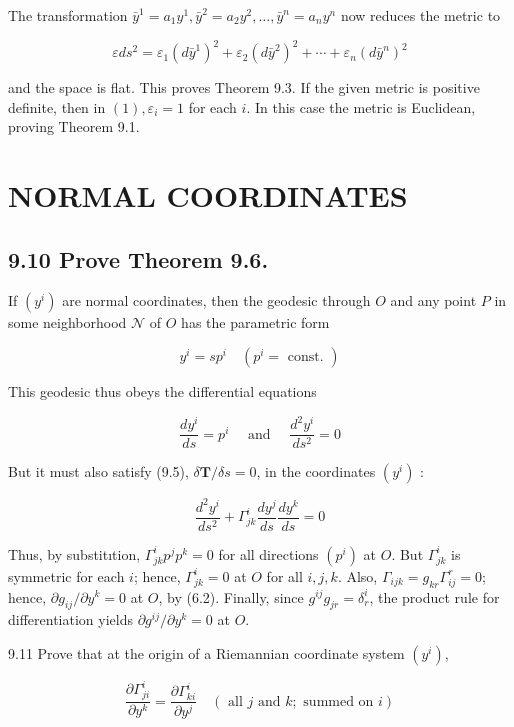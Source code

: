 \documentclass[10pt]{article}
\begin{document}
The transformation $\bar{y}^{1}=a_{1} y^{1}, \bar{y}^{2}=a_{2} y^{2}, \ldots, \bar{y}^{n}=a_{n} y^{n}$ now reduces the metric to


\begin{equation*}
\varepsilon d s^{2}=\varepsilon_{1}\left(d \bar{y}^{1}\right)^{2}+\varepsilon_{2}\left(d \bar{y}^{2}\right)^{2}+\cdots+\varepsilon_{n}\left(d \bar{y}^{n}\right)^{2} \tag{1}
\end{equation*}


and the space is flat. This proves Theorem 9.3. If the given metric is positive definite, then in $(1), \varepsilon_{i}=1$ for each $i$. In this case the metric is Euclidean, proving Theorem 9.1.

\section*{NORMAL COORDINATES}
\subsection*{9.10 Prove Theorem 9.6.}
If $\left(y^{i}\right)$ are normal coordinates, then the geodesic through $O$ and any point $P$ in some neighborhood $\mathcal{N}$ of $O$ has the parametric form

$$
y^{i}=s p^{i} \quad\left(p^{i}=\text { const. }\right)
$$

This geodesic thus obeys the differential equations

$$
\frac{d y^{i}}{d s}=p^{i} \quad \text { and } \quad \frac{d^{2} y^{i}}{d s^{2}}=0
$$

But it must also satisfy (9.5), $\delta \mathbf{T} / \delta s=0$, in the coordinates $\left(y^{i}\right)$ :

$$
\frac{d^{2} y^{i}}{d s^{2}}+\Gamma_{j k}^{i} \frac{d y^{j}}{d s} \frac{d y^{k}}{d s}=0
$$

Thus, by substitıtion, $\Gamma_{j k}^{i} p^{j} p^{k}=0$ for all directions $\left(p^{i}\right)$ at $O$. But $\Gamma_{j k}^{i}$ is symmetric for each $i$; hence, $\Gamma_{j k}^{i}=0$ at $O$ for all $i, j, k$. Also, $\Gamma_{i j k}=g_{k r} \Gamma_{i j}^{r}=0$; hence, $\partial g_{i j} / \partial y^{k}=0$ at $O$, by (6.2). Finally, since $g^{i j} g_{j r}=\delta_{r}^{i}$, the product rule for differentiation yields $\partial g^{i j} / \partial y^{k}=0$ at $O$.

9.11 Prove that at the origin of a Riemannian coordinate system $\left(y^{i}\right)$,

$$
\frac{\partial \Gamma_{j i}^{i}}{\partial y^{k}}=\frac{\partial \Gamma_{k i}^{i}}{\partial y^{j}} \quad(\text { all } j \text { and } k ; \text { summed on } i)
$$
\end{document}
